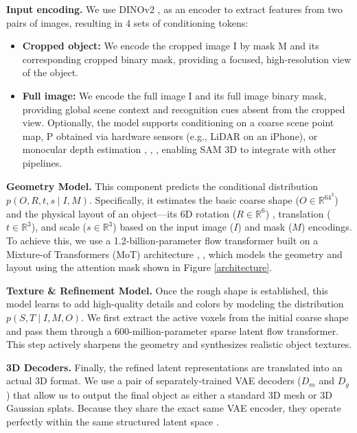 \documentclass[manuscript,review]{acmart}
\begin{document}
\textbf{Input encoding.} We use DINOv2 \citet{oquab2023dinov2}, \citeyear{oquab2023dinov2} as an encoder to extract features from two pairs of images, resulting in 4 sets of conditioning tokens:

\begin{itemize}
    \item \textbf{Cropped object:} We encode the cropped image I by mask M and its corresponding cropped binary mask, providing a focused, high-resolution view of the object.

    \item \textbf{Full image:} We encode the full image I and its full image binary mask, providing global scene context
and recognition cues absent from the cropped view. Optionally, the model supports conditioning on a coarse scene point map, P obtained via hardware sensors (e.g., LiDAR on an iPhone), or monocular depth estimation \citet{yang2024depth}, \citeyear{yang2024depth}\; \citet{wang2025moge}, \citeyear{wang2025moge}, enabling SAM 3D to integrate with other pipelines.
\end{itemize}

\textbf{Geometry Model.} This component predicts the conditional distribution $p(O, R, t, s \mid I, M)$. Specifically, it estimates the basic coarse shape ($O \in \mathbb{R}^{64^3}$) and the physical layout of an object---its 6D rotation ($R \in \mathbb{R}^6$) \citet{zhou2019continuity}\citeyear{zhou2019continuity}, translation ($t \in \mathbb{R}^3$), and scale ($s \in \mathbb{R}^3$) based on the input image ($I$) and mask ($M$) encodings. To achieve this, we use a 1.2-billion-parameter flow transformer built on a Mixture-of Transformers (MoT) architecture \citet{liang2025mixtureoftransformers}, \citet{deng2025Bagel}, which models the geometry and layout using the attention mask shown in Figure \ref{architecture}.

\textbf{Texture \& Refinement Model.} Once the rough shape is established, this model learns to add high-quality details and colors by modeling the distribution $p(S, T \mid I, M, O)$. We first extract the active voxels from the initial coarse shape and pass them through a 600-million-parameter sparse latent flow transformer. This step actively sharpens the geometry and synthesizes realistic object textures.

\textbf{3D Decoders.} Finally, the refined latent representations are translated into an actual 3D format. We use a pair of separately-trained VAE decoders ($D_m$ and $D_g$) that allow us to output the final object as either a standard 3D mesh or 3D Gaussian splats. Because they share the exact same VAE encoder, they operate perfectly within the same structured latent space \citet{xiang2025structured}\citeyear{xiang2025structured}.
\end{document}

